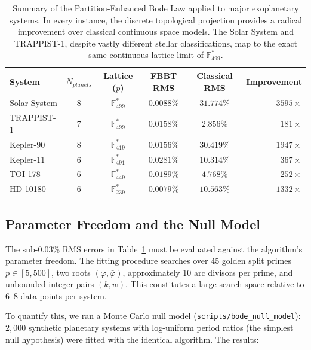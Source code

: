 \begin{table}[ht]
\centering
\renewcommand{\arraystretch}{1.3}
\begin{tabular}{@{}lccccr@{}}
\toprule
\textbf{System} & $N_{planets}$ & \textbf{Lattice ($p$)} & \textbf{FBBT RMS} & \textbf{Classical RMS} & \textbf{Improvement} \\
\midrule
Solar System & 8 & $\mathbb{F}_{499}^*$ & $0.0088\%$ & $31.774\%$ & $3595\times$ \\
TRAPPIST-1 & 7 & $\mathbb{F}_{499}^*$ & $0.0158\%$ & $2.856\%$ & $181\times$ \\
Kepler-90 & 8 & $\mathbb{F}_{419}^*$ & $0.0156\%$ & $30.419\%$ & $1947\times$ \\
Kepler-11 & 6 & $\mathbb{F}_{491}^*$ & $0.0281\%$ & $10.314\%$ & $367\times$ \\
TOI-178 & 6 & $\mathbb{F}_{449}^*$ & $0.0189\%$ & $4.768\%$ & $252\times$ \\
HD 10180 & 6 & $\mathbb{F}_{239}^*$ & $0.0079\%$ & $10.563\%$ & $1332\times$ \\
\bottomrule
\end{tabular}
\caption{Summary of the Partition-Enhanced Bode Law applied to major exoplanetary systems. In every instance, the discrete topological projection provides a radical improvement over classical continuous space models. The Solar System and TRAPPIST-1, despite vastly different stellar classifications, map to the exact same continuous lattice limit of $\mathbb{F}_{499}^*$.}
\label{tab:bode_summary}
\end{table}

\subsection{Parameter Freedom and the Null Model}\label{sec:null_model}

The sub-$0.03\%$ RMS errors in Table~\ref{tab:bode_summary} must be evaluated against the algorithm's parameter freedom. The fitting procedure searches over 45 golden split primes $p \in [5, 500]$, two roots $(\varphi, \bar{\varphi})$, approximately 10 arc divisors per prime, and unbounded integer pairs $(k, w)$. This constitutes a large search space relative to $6$--$8$ data points per system.

To quantify this, we ran a Monte Carlo null model (\texttt{scripts/bode\_null\_model}): $2{,}000$ synthetic planetary systems with log-uniform period ratios (the simplest null hypothesis) were fitted with the identical algorithm. The results:

